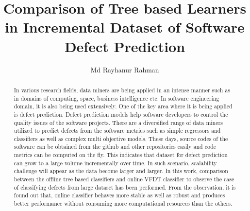 \documentclass[sigplan]{acmart}\settopmatter{printfolios=true,printccs=false,printacmref=false}
\begin{document}
\title[Comparison of Tree based Learners in Incremental Dataset]{Comparison of Tree based Learners in Incremental Dataset of Software Defect Prediction}         
\subtitle{}                    


\author{Md Rayhanur Rahman}



\begin{abstract}
In various research fields, data miners are being applied in an intense manner such as in domains of computing, space, business intelligence etc. In software engineering domain, it is also being used extensively. One of the key area where it is being applied is defect prediction. Defect prediction models help software developers to control the quality issues of the software projects. There are a diversified range of data miners utilized to predict defects from the software metrics such as simple regressors and classifiers as well as complex multi objective models. These days, source codes of the software can be obtained from the github and other repositories easily and code metrics can be computed on the fly. This indicates that dataset for defect prediction can grow to a large volume incrementally over time. In such scenario, scalability challenge will appear as the data become larger and larger. In this work, comparison between the offline tree based classifiers and online VFDT classifier to observe the case of classifying defects from large dataset has been performed. From the observation, it is found out that, online classifier behaves more stable as well as robust and produces better performance without consuming more computational resources than the others.  
\end{abstract}


\maketitle
\end{document}
